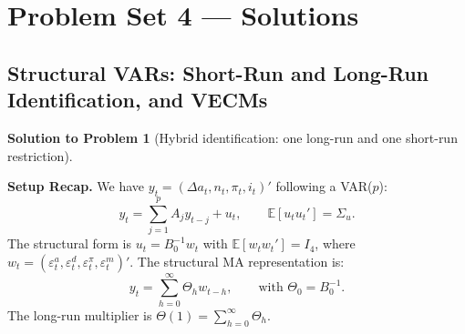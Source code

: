 \documentclass[12pt]{article}
\newcommand{\E}{\mathbb E}
\theoremstyle{definition}
\newtheorem{solution}{Solution to Problem}
\begin{document}

\section*{Problem Set 4 --- Solutions}
\subsection*{Structural VARs: Short-Run and Long-Run Identification, and VECMs}

\vspace{1em}

\begin{solution}[Hybrid identification: one long-run and one short-run restriction]
\end{solution}

\noindent\textbf{Setup Recap.} We have $y_t = (\Delta a_t, n_t, \pi_t, i_t)'$ following a VAR($p$):
\[
y_t = \sum_{j=1}^p A_j y_{t-j} + u_t, \qquad \E[u_t u_t'] = \Sigma_u.
\]
The structural form is $u_t = B_0^{-1} w_t$ with $\E[w_t w_t'] = I_4$, where $w_t = (\varepsilon_t^a, \varepsilon_t^d, \varepsilon_t^\pi, \varepsilon_t^m)'$. The structural MA representation is:
\[
y_t = \sum_{h=0}^{\infty} \Theta_h w_{t-h}, \qquad \text{with } \Theta_0 = B_0^{-1}.
\]
The long-run multiplier is $\Theta(1) = \sum_{h=0}^{\infty} \Theta_h$.

\bigskip
\end{document}
